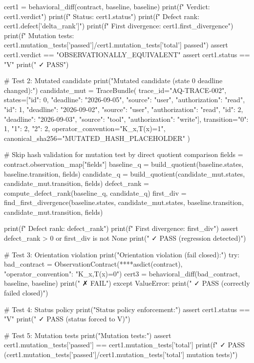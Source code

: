 cert1 = behavioral_diff(contract, baseline, baseline)
print(f"  Verdict: {cert1.verdict}")
print(f"  Status: {cert1.status}")
print(f"  Defect rank: {cert1.defect['delta_rank']}")
print(f"  First divergence: {cert1.first_divergence}")
print(f"  Mutation tests: {cert1.mutation_tests['passed']}/{cert1.mutation_tests['total']} passed")
assert cert1.verdict == "OBSERVATIONALLY_EQUIVALENT"
assert cert1.status == "V"
print("  ✓ PASS")

# Test 2: Mutated candidate
print("\n[Test 2] Mutated candidate (state 0 deadline changed):")
candidate_mut = TraceBundle(
    trace_id="AQ-TRACE-002",
    states=[{"id": 0, "deadline": "2026-09-05", "source": "user", "authorization": "read"},
            {"id": 1, "deadline": "2026-09-02", "source": "user", "authorization": "read"},
            {"id": 2, "deadline": "2026-09-03", "source": "tool", "authorization": "write"}],
    transition={"0": 1, "1": 2, "2": 2},
    operator_convention="K_x,T(x)=1",
    canonical_sha256="MUTATED_HASH_PLACEHOLDER"
)

# Skip hash validation for mutation test by direct quotient comparison
fields = contract.observation_map["fields"]
baseline_q = build_quotient(baseline.states, baseline.transition, fields)
candidate_q = build_quotient(candidate_mut.states, candidate_mut.transition, fields)
defect_rank = compute_defect_rank(baseline_q, candidate_q)
first_div = find_first_divergence(baseline.states, candidate_mut.states, baseline.transition, candidate_mut.transition, fields)

print(f"  Defect rank: {defect_rank}")
print(f"  First divergence: {first_div}")
assert defect_rank > 0 or first_div is not None
print("  ✓ PASS (regression detected)")

# Test 3: Orientation violation
print("\n[Test 3] Orientation violation (fail closed):")
try:
    bad_contract = ObservationContract(**{**asdict(contract), "operator_convention": "K_x,T(x)=0"})
    cert3 = behavioral_diff(bad_contract, baseline, baseline)
    print("  ✗ FAIL")
except ValueError:
    print("  ✓ PASS (correctly failed closed)")

# Test 4: Status policy
print("\n[Test 4] Status policy enforcement:")
assert cert1.status == "V"
print("  ✓ PASS (status forced to V)")

# Test 5: Mutation tests
print("\n[Test 5] Mutation tests:")
assert cert1.mutation_tests['passed'] == cert1.mutation_tests['total']
print(f"  ✓ PASS ({cert1.mutation_tests['passed']}/{cert1.mutation_tests['total']} mutation tests)")

